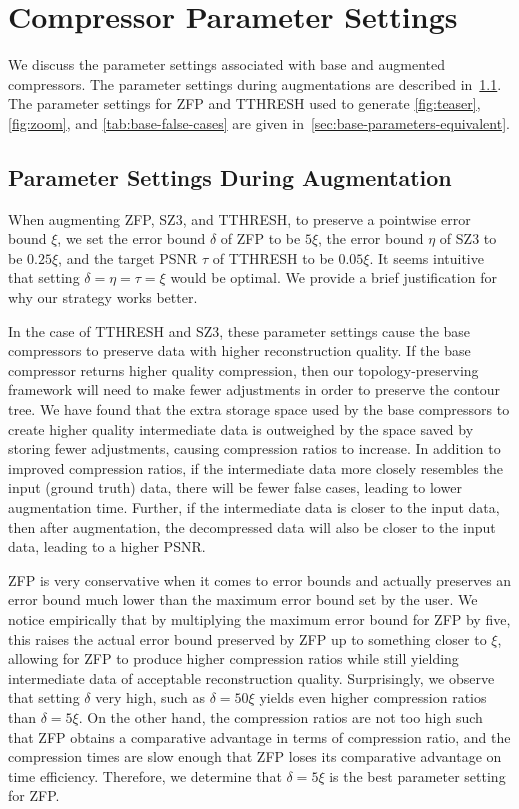 \section{Compressor Parameter Settings}
\label{sec:base-compressor-parameters}

We discuss the parameter settings associated with base and augmented compressors. 
The parameter settings during augmentations are described in~\cref{sec:base-parameters-during-augmentation}. The parameter settings for ZFP and TTHRESH used to generate \cref{fig:teaser}, \cref{fig:zoom}, and \cref{tab:base-false-cases} are given in~\cref{sec:base-parameters-equivalent}.

\subsection{Parameter Settings During Augmentation}
\label{sec:base-parameters-during-augmentation}

When augmenting ZFP, SZ3, and TTHRESH, to preserve a pointwise error bound $\xi$, we set the error bound $\delta$ of ZFP to be $5\xi$, the error bound $\eta$ of SZ3 to be $0.25\xi$, and the target PSNR $\tau$ of TTHRESH to be $0.05\xi$. 
It seems intuitive that setting $\delta = \eta = \tau = \xi$ would be optimal. We provide a brief justification for why our strategy works better.

In the case of TTHRESH and SZ3, these parameter settings cause the base compressors to preserve data with higher reconstruction quality. If the base compressor returns higher quality compression, then our topology-preserving framework will need to make fewer adjustments in order to preserve the contour tree. 
We have found that the extra storage space used by the base compressors to create higher quality intermediate data is outweighed by the space saved by storing fewer adjustments, causing compression ratios to increase. In addition to improved compression ratios, if the intermediate data more closely resembles the input (ground truth) data, there will be fewer false cases, leading to lower augmentation time. Further, if the intermediate data is closer to the input data, then after augmentation, the decompressed data will also be closer to the input data, leading to a higher PSNR.

ZFP is very conservative when it comes to error bounds and actually preserves an error bound much lower than the maximum error bound set by the user. We notice empirically that by multiplying the maximum error bound for ZFP by five, this raises the actual error bound preserved by ZFP up to something closer to $\xi$, allowing for ZFP to produce higher compression ratios while still yielding intermediate data of acceptable reconstruction quality. 
Surprisingly, we observe that setting $\delta$ very high, such as $\delta = 50\xi$ yields even higher compression ratios than $\delta = 5\xi$. On the other hand, the compression ratios are not too high such that ZFP obtains a comparative advantage in terms of compression ratio, and the compression times are slow enough that ZFP loses its comparative advantage on time efficiency. Therefore, we determine that $\delta = 5\xi$ is the best parameter setting for ZFP.

